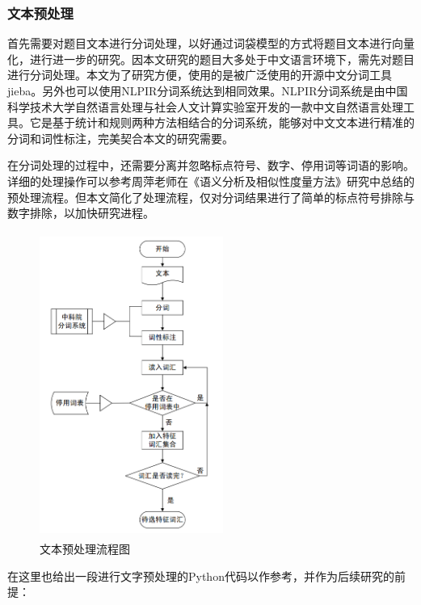 \subsubsection{文本预处理}

首先需要对题目文本进行分词处理，以好通过词袋模型的方式将题目文本进行向量化，进行进一步的研究。因本文研究的题目大多处于中文语言环境下，需先对题目进行分词处理。本文为了研究方便，使用的是被广泛使用的开源中文分词工具jieba。另外也可以使用NLPIR分词系统达到相同效果。NLPIR分词系统是由中国科学技术大学自然语言处理与社会人文计算实验室开发的一款中文自然语言处理工具。它是基于统计和规则两种方法相结合的分词系统，能够对中文文本进行精准的分词和词性标注，完美契合本文的研究需要。

在分词处理的过程中，还需要分离并忽略标点符号、数字、停用词等词语的影响。详细的处理操作可以参考周萍老师在《语义分析及相似性度量方法》\cite{ZhouJiYuYuYiFenXiDeWenBenXiangSiXingDuLiangYanJiuJiYingYong2017}研究中总结的预处理流程。但本文简化了处理流程，仅对分词结果进行了简单的标点符号排除与数字排除，以加快研究进程。

\begin{figure}[htbp]
    \centering
    \includegraphics[width=6cm,height=10cm]{res/Text preprocessing process.png}
    \caption{文本预处理流程图}
\end{figure} 

在这里也给出一段进行文字预处理的Python代码以作参考，并作为后续研究的前提：

\begin{mgCodeBlock}
\end{mgCodeBlock}


